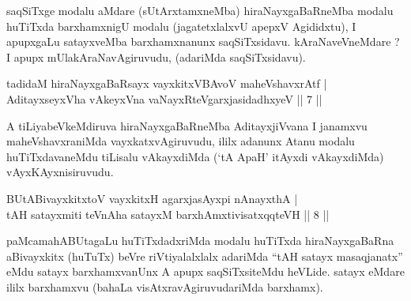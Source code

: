 \begin{artha}
saqSiTxge modalu aMdare (sUtArxtamxneMba) hiraNayxgaBaRneMba modalu huTiTxda barxhamxnigU modalu (jagatetxlalxvU apepxV Agididxtu), I apupxgaLu satayxveMba barxhamxnanunx saqSiTxsidavu. kAraNaveVneMdare ? I apupx mUlakAraNavAgiruvudu, (adariMda saqSiTxsidavu).
\end{artha}

\begin{shl}
tadidaM hiraNayxgaBaRsayx \footnotemark{}vayxkitxVBAvoV maheVshavxrAtf | \\
AditayxseyxVha vAkeyxVna vaNayxRteV\s garxjasidadhxyeV \hfill ||  7 || 
\end{shl}

\begin{artha}
A tiLiyabeVkeMdiruva hiraNayxgaBaRneMba AditayxjiVvana I janamxvu maheVshavxraniMda vayxkatxvAgiruvudu, ililx adanunx Atanu modalu huTiTxdavaneMdu tiLisalu vAkayxdiMda (`tA ApaH' itAyxdi vAkayxdiMda) vAyxKAyxnisiruvudu.
\end{artha}

\begin{shl}
\footnotemark{}BUtABivayxkitxtoV vayxkitxH agarxjasAyxpi nAnayxthA | \\
tAH satayxmiti teVnA\s \s ha satayxM barxhAmxtivisatxqqteVH \hfill ||  8 || 
\end{shl}

\begin{artha}
paMcamahABUtagaLu huTiTxdadxriMda modalu huTiTxda hiraNayxgaBaRna aBivayxkitx (huTuTx) beVre riVtiyalalxlalx adariMda ``tAH satayx masaqjanatx'' eMdu satayx barxhamxvanUnx A apupx saqSiTxsiteMdu heVLide. satayx eMdare ililx barxhamxvu (bahaLa visAtxravAgiruvudariMda barxhamx).
\end{artha}


